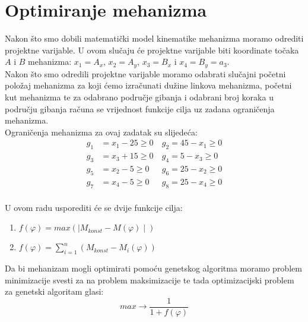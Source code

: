 \chapter{Optimiranje mehanizma}
Nakon što smo dobili matematički model kinematike mehanizma moramo odrediti projektne varijable. U ovom slučaju će projektne varijable biti koordinate točaka $A$ i $B$ mehanizma:
$x_1=A_x$, $x_2=A_y$, $x_3=B_x$ i $x_4=B_y=a_3$.\\

Nakon što smo odredili projektne varijable moramo odabrati slučajni početni položaj mehanizma za koji ćemo izračunati dužine linkova mehanizma, početni kut mehanizma te za odabrano područje gibanja i odabrani broj koraka u području gibanja računa se vrijednost funkcije cilja uz zadana ograničenja mehanizma.\\

Ograničenja mehanizma za ovaj zadatak su slijedeća:
\begin{align*}
g_1&=x_1-25\geq 0\  &g_2=45-x_1\geq 0\\
g_3&=x_3+15\geq 0\   &g_4=5-x_3\geq 0\\
g_5&=x_2-5\geq 0\  &g_6=25-x_2\geq 0\\
g_7&=x_4-5\geq 0\   &g_8=25-x_4\geq 0\\
\end{align*}

U ovom radu usporediti će se dvije funkcije cilja:
\begin{enumerate}
\item $f(\varphi)=max\left( \mid M_{konst}-M(\varphi)\mid\right) $
\item $f(\varphi)=\sum_{i=1}^{n}\left( M_{konst}-M_i(\varphi) \right)$
\end{enumerate}

Da bi mehanizam mogli optimirati pomoću genetskog algoritma moramo problem minimizacije svesti za na problem maksimizacije te tada optimizacijski problem za genetski algoritam glasi:
\begin{equation}
max \rightarrow \dfrac{1}{1+f(\varphi)}
\end{equation}